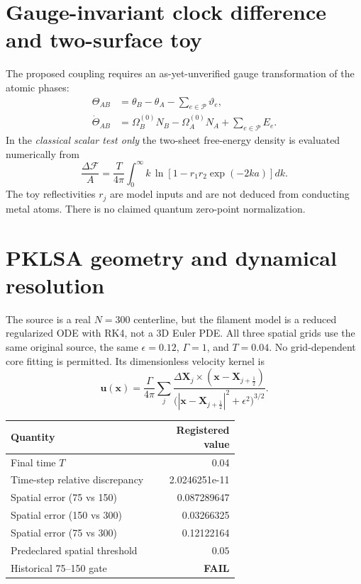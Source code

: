 \documentclass[10pt,a4paper]{article}
\begin{document}
\section{Gauge-invariant clock difference and two-surface toy}
The proposed coupling requires an as-yet-unverified gauge transformation of the atomic phases:
\begin{align}
\Theta_{AB}&=\theta_B-\theta_A-\sum_{e\in\mathcal P}\vartheta_e,\\
\dot\Theta_{AB}&=\Omega_B^{(0)}N_B-\Omega_A^{(0)}N_A
+\sum_{e\in\mathcal P}E_e.
\end{align}
In the \emph{classical scalar test only} the two-sheet free-energy density is evaluated numerically from
\[
\frac{\Delta\mathcal F}{A}=\frac{T}{4\pi}\int_0^\infty k\,
\ln\!\left[1-r_1r_2\exp(-2ka)\right]dk.
\]
The toy reflectivities $r_j$ are model inputs and are not deduced from conducting metal atoms. There is no claimed quantum zero-point normalization.
\section{PKLSA geometry and dynamical resolution}
The source is a real $N=300$ centerline, but the filament model is a reduced regularized ODE with RK4, not a 3D Euler PDE. All three spatial grids use the same original source, the same $\epsilon=0.12$, $\Gamma=1$, and $T=0.04$. No grid-dependent core fitting is permitted. Its dimensionless velocity kernel is
\[
\mathbf u(\mathbf x)=\frac{\Gamma}{4\pi}\sum_j
\frac{\Delta\mathbf X_j\times(\mathbf x-\mathbf X_{j+\frac12})}
{\big(|\mathbf x-\mathbf X_{j+\frac12}|^2+\epsilon^2\big)^{3/2}}.
\]
\begin{tabular}{@{}p{0.64\linewidth}r@{}}\toprule
Quantity & Registered value \\\midrule
Final time $T$ & 0.04 \\
Time-step relative discrepancy & 2.0246251e-11 \\
Spatial error (75 vs 150) & 0.087289647 \\
Spatial error (150 vs 300) & 0.03266325 \\
Spatial error (75 vs 300) & 0.12122164 \\
Predeclared spatial threshold & $0.05$ \\
Historical 75--150 gate & \textbf{FAIL} \\
\bottomrule\end{tabular}
\end{document}
